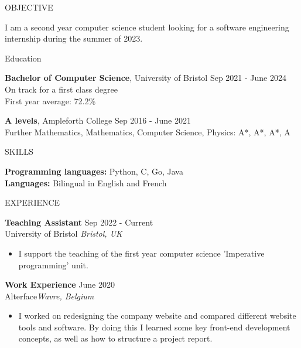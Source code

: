\documentclass{resume} %
\begin{document}

\begin{rSection}{OBJECTIVE}

{I am a second year computer science student looking for a software engineering internship during the summer of 2023.}


\end{rSection}

\begin{rSection}{Education}

{\bf Bachelor of Computer Science}, University of Bristol \hfill {Sep 2021 - June 2024} \\
On track for a first class degree \\
First year average: 72.2\%

{\bf A levels}, Ampleforth College \hfill {Sep 2016 - June 2021} \\
Further Mathematics, Mathematics, Computer Science, Physics: A*, A*, A*, A

\end{rSection}

\begin{rSection}{SKILLS}

{\bf Programming languages:} Python, C, Go, Java\\
{\bf Languages:} Bilingual in English and French

\end{rSection}

\begin{rSection}{EXPERIENCE}

\textbf{Teaching Assistant} \hfill Sep 2022 - Current\\
University of Bristol \hfill \textit{Bristol, UK}
 \begin{itemize}
    \itemsep -3pt {} 
     \item I support the teaching of the first year computer science 'Imperative programming' unit.
 \end{itemize}
 
 \textbf{Work Experience} \hfill June 2020\\
Alterface\hfill \textit{Wavre, Belgium}
 \begin{itemize}
    \itemsep -3pt {} 
     \item I worked on redesigning the company website and
compared different website tools and software. By
doing this I learned some key front-end development
concepts, as well as how to structure a project report.
 \end{itemize}

\end{rSection} 
\end{document}
